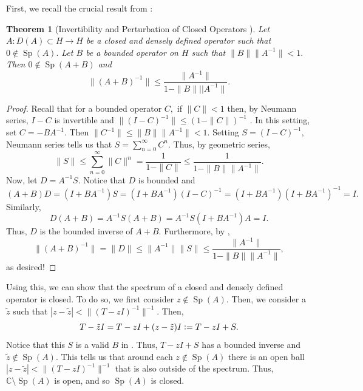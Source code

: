 \documentclass[12pt,a4paper]{article}
\newcommand{\defeq}{\vcentcolon=}
\newcommand{\Sp}[1]{\operatorname{Sp}\!\left(#1\right)}
\theoremstyle{boldthm}
\newtheorem{theorem}{Theorem}[section]
\theoremstyle{bolddefn}
\begin{document}
First, we recall the crucial result from \cite{Nick}:
\begin{theorem}[Invertibility and Perturbation of Closed Operators {\cite[Theorem 4.1]{Nick}} {\cite[Exercise 1.17]{Matt}}]\label{first stable}
    Let $A:D(A) \subset H \rightarrow H$ be a closed and densely defined operator such that $0 \notin \Sp{A}.$ Let $B$ be a bounded operator on $H$ such that $\|B\|\| A^{-1} \| < 1.$ Then $0 \notin \Sp{A+B}$ and 
    \begin{equation}
        \| (A+B)^{-1}\| \le \frac{\|A^{-1}\|}{1 - \|B\|||A^{-1}\|}.
    \end{equation}
\end{theorem}
\begin{proof}
    Recall that for a bounded operator $C,$ if $\|C\| < 1 $ then, by Neumann series, $I-C$ is invertible and $\| (I-C)^{-1} \| \le (1 - \|C\|)^{-1}$ \cite[Page 30]{kato}. In this setting, set $C = -BA^{-1}.$ Then $\|C^{-1}\| \le \|B\|\|A^{-1} \| < 1.$ Setting $S = (I-C)^{-1},$ Neumann series tells us that $S = \sum_{n=0}^{\infty} C^n.$ Thus, by geometric series,
    \begin{equation} \label{S eqn}
        \|S\| \le \sum_{n=0}^{\infty} \|C\|^n = \frac{1}{1-\|C\|} \le \frac{1}{1 - \|B\|\|A^{-1}\|}.
    \end{equation}
Now, let $D = A^{-1}S.$ Notice that $D$ is bounded and 
\begin{equation}
    (A+B)D = (I + BA^{-1})S = (I+BA^{-1})(I - C)^{-1} = (I+BA^{-1})(I+BA^{-1})^{-1} = I.
\end{equation}
Similarly, 
\begin{equation}
   D(A+B) = A^{-1}S(A+B) =  A^{-1}S(I+BA^{-1})A = I.
\end{equation}
Thus, $D$ is the bounded inverse of $A+B.$ Furthermore, by ,
\begin{equation}
    \|(A+B)^{-1} \| = \|D\| \le \|A^{-1}\|\|S\|\le \frac{\|A^{-1}\|}{1 - \|B\|\|A^{-1}\|},
\end{equation}
as desired!
\end{proof}

Using this, we can show that the spectrum of a closed and densely defined operator is closed. To do so, we first consider $z \notin \Sp{A}.$ Then, we consider a $\tilde z$ such that $|z-\tilde z| < \| (T-zI)^{-1}\|^{-1}.$ Then,
\begin{equation}
    T - \tilde z I = T - zI + (z - \tilde z) I \defeq T-zI + S.
\end{equation}
Notice that this $S$ is a valid $B$ in . Thus, $T-zI + S$ has a bounded inverse and $\tilde z \notin \Sp{A}.$ This tells us that around each $z \notin \Sp{A}$ there is an open ball $|z-\tilde z| < \| (T-zI)^{-1}\|^{-1}$ that is also outside of the spectrum. Thus, $\mathbb{C} \setminus \Sp{A}$ is open, and so $\Sp{A}$ is closed. 
\end{document}
